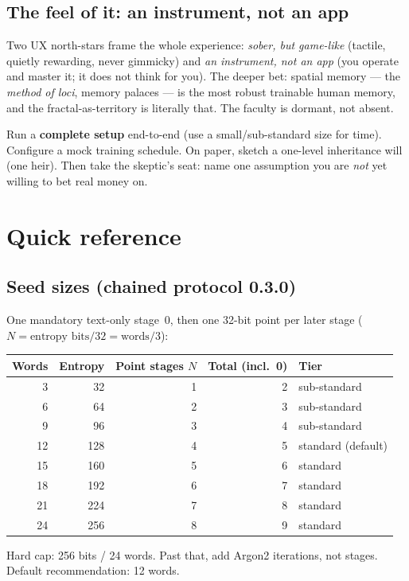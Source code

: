 \documentclass[a4paper,11pt]{report}
\begin{document}
\section{The feel of it: an instrument, not an app}
Two UX north-stars frame the whole experience: \emph{sober, but game-like}
(tactile, quietly rewarding, never gimmicky) and \emph{an instrument, not an app}
(you operate and master it; it does not think for you). The deeper bet: spatial
memory — the \emph{method of loci}, memory palaces — is the most robust trainable
human memory, and the fractal-as-territory is literally that. The faculty is
dormant, not absent.


\begin{tryit}
Run a \textbf{complete setup} end-to-end (use a small/sub-standard size for time).
Configure a mock training schedule. On paper, sketch a one-level inheritance will
(one heir). Then take the skeptic's seat: name one assumption you are \emph{not}
yet willing to bet real money on.
\end{tryit}

\appendix
\chapter{Quick reference}

\section{Seed sizes (chained protocol 0.3.0)}
One mandatory text-only stage~0, then one 32-bit point per later stage
($N = \text{entropy bits}/32 = \text{words}/3$):

\begin{center}\small
\begin{tabular}{r r r r l}
\toprule
\textbf{Words} & \textbf{Entropy} & \textbf{Point stages $N$} & \textbf{Total (incl.\ 0)} & \textbf{Tier}\\
\midrule
3 & 32 & 1 & 2 & sub-standard\\
6 & 64 & 2 & 3 & sub-standard\\
9 & 96 & 3 & 4 & sub-standard\\
12 & 128 & 4 & 5 & standard (default)\\
15 & 160 & 5 & 6 & standard\\
18 & 192 & 6 & 7 & standard\\
21 & 224 & 7 & 8 & standard\\
24 & 256 & 8 & 9 & standard\\
\bottomrule
\end{tabular}
\end{center}
\noindent Hard cap: 256 bits / 24 words. Past that, add Argon2 iterations, not
stages. Default recommendation: 12 words.
\end{document}
